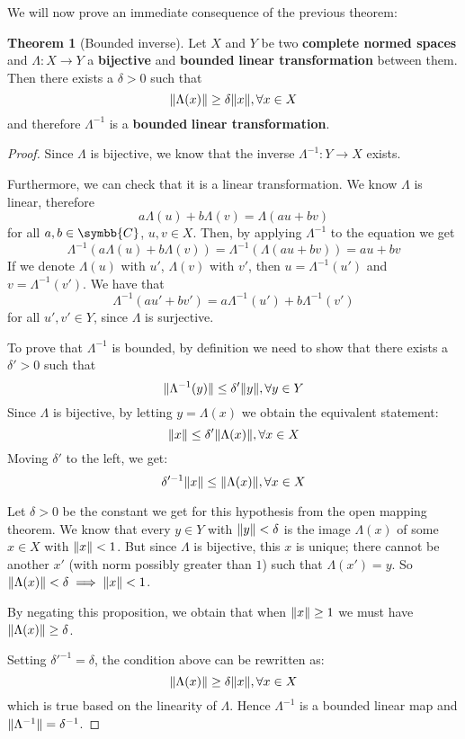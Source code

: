 \documentclass[a4paper, 12pt]{article}
\theoremstyle{definition}
\newtheorem*{theorem}{Theorem}
\newcommand{\complex}{\symbb{C}}
\DeclarePairedDelimiter{\norm}{\lVert}{\rVert}
\begin{document}
We will now prove an immediate consequence of the previous theorem:
\begin{theorem}[Bounded inverse]
Let \(X\) and \(Y\) be two \textbf{complete normed spaces} and \(\Lambda \colon X \to Y\) a \textbf{bijective} and \textbf{bounded} \textbf{linear transformation} between them. \\
Then there exists a \(\delta > 0\) such that
\[
    \norm{\Lambda(x)} \geq \delta \norm{x}, \forall x \in X
\]
and therefore \(\Lambda^{-1}\) is a \textbf{bounded} \textbf{linear transformation}.
\end{theorem}
\begin{proof}
Since \(\Lambda\) is bijective, we know that the inverse \(\Lambda^{-1} \colon Y \to X\) exists.

Furthermore, we can check that it is a linear transformation. We know \(\Lambda\) is linear, therefore
\[
    a \Lambda(u) + b \Lambda(v) = \Lambda(au + bv)
\]
for all \(a, b \in \complex\), \(u, v \in X\). Then, by applying \(\Lambda^{-1}\) to the equation we get
\[
    \Lambda^{-1} (a \Lambda(u) + b \Lambda(v)) = \Lambda^{-1}(\Lambda(au + bv)) = au + bv
\]
If we denote \(\Lambda(u)\) with \(u'\), \(\Lambda(v)\) with \(v'\), then \(u = \Lambda^{-1}(u')\) and \(v = \Lambda^{-1}(v')\). We have that
\[
    \Lambda^{-1} (a u' + b v') = a \Lambda^{-1} (u') + b \Lambda^{-1} (v')
\]
for all \(u', v' \in Y\), since \(\Lambda\) is surjective.

To prove that \(\Lambda^{-1}\) is bounded, by definition we need to show that there exists a \(\delta' > 0\) such that
\[
    \norm{\Lambda^{-1}(y)} \leq \delta' \norm{y}, \forall y \in Y
\]
Since \(\Lambda\) is bijective, by letting \(y = \Lambda(x)\) we obtain the equivalent statement:
\[
    \norm{x} \leq \delta' \norm{\Lambda(x)}, \forall x \in X
\]
Moving \(\delta'\) to the left, we get:
\[
    \delta'^{-1} \norm{x} \leq \norm{\Lambda(x)}, \forall x \in X
\]

Let \(\delta > 0\) be the constant we get for this hypothesis from the open mapping theorem. We know that every \(y \in Y\) with \(\norm{y} < \delta\) is the image \(\Lambda(x)\) of some \(x \in X\) with \(\norm{x} < 1\). But since \(\Lambda\) is bijective, this \(x\) is unique; there cannot be another \(x'\) (with norm possibly greater than \(1\)) such that \(\Lambda(x') = y\). So \(\norm{\Lambda(x)} < \delta \implies \norm{x} < 1\).

By negating this proposition, we obtain that when \(\norm{x} \geq 1\) we must have \(\norm{\Lambda(x)} \geq \delta\).

Setting \(\delta'^{-1} = \delta\), the condition above can be rewritten as:
\[
    \norm{\Lambda(x)} \geq \delta \norm{x}, \forall x \in X
\]
which is true based on the linearity of \(\Lambda\). Hence \(\Lambda^{-1}\) is a bounded linear map and \(\norm{\Lambda^{-1}} = \delta^{-1}\).
\end{proof}
\end{document}
